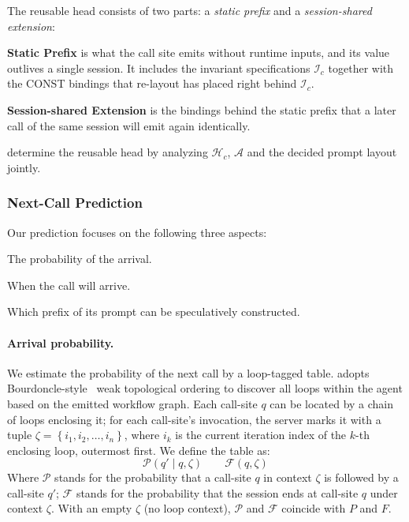 The reusable head consists of two parts: a \emph{static prefix} and a \emph{session-shared extension}:
\begin{enumerate*}[label=(\roman*)]
    \item \textbf{Static Prefix} is what the call site emits without runtime inputs, and its value outlives a single session. It includes the invariant specifications $\mathcal{I}_c$ together with the CONST bindings that re-layout has placed right behind $\mathcal{I}_c$.
    \item \textbf{Session-shared Extension} is the bindings behind the static prefix that a later call of the same session will emit again identically.
\end{enumerate*}
\sysname determine the reusable head by analyzing $\mathcal{H}_c$, $\mathcal{A}$ and the decided prompt layout jointly.

\subsubsection{Next-Call Prediction}
Our prediction focuses on the following three aspects:
\begin{enumerate*}[label=(\roman*)]
    \item The probability of the arrival.
    \item When the call will arrive.
    \item Which prefix of its prompt can be speculatively constructed.
\end{enumerate*}

\paragraph{Arrival probability.}
We estimate the probability of the next call by a loop-tagged table. \sysname adopts Bourdoncle-style~\cite{bourdoncle1993efficient} weak topological ordering to discover all loops within the agent based on the emitted workflow graph. Each call-site $q$ can be located by a chain of loops enclosing it; for each call-site's invocation, the server marks it with a tuple $\zeta=\left\{i_1, i_2, \dots, i_n\right\}$, where $i_k$ is the current iteration index of the $k$-th enclosing loop, outermost first. We define the table as:
\[
\mathcal{P}(q' \mid q, \zeta) \qquad \mathcal{F}(q, \zeta)
\]
Where $\mathcal{P}$ stands for the probability that a call-site $q$ in context $\zeta$ is followed by a call-site $q'$; $\mathcal{F}$ stands for the probability that the session ends at call-site $q$ under context $\zeta$. With an empty $\zeta$ (no loop context), $\mathcal{P}$ and $\mathcal{F}$ coincide with $P$ and $F$.

